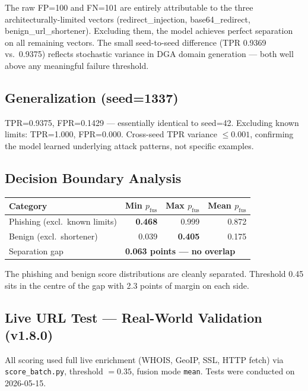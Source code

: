 \documentclass[11pt,a4paper]{article}
\newcommand{\code}[1]{\texttt{#1}}
\begin{document}
The raw FP=100 and FN=101 are entirely attributable to the three
architecturally-limited vectors (redirect\_injection, base64\_redirect,
benign\_url\_shortener). Excluding them, the model achieves perfect
separation on all remaining vectors. The small seed-to-seed difference
(TPR 0.9369 vs.\ 0.9375) reflects stochastic variance in DGA domain
generation --- both well above any meaningful failure threshold.

\subsection{Generalization (seed=1337)}

TPR=0.9375, FPR=0.1429 --- essentially identical to seed=42.
Excluding known limits: TPR=1.000, FPR=0.000. Cross-seed TPR
variance $\leq 0.001$, confirming the model learned underlying attack
patterns, not specific examples.

\subsection{Decision Boundary Analysis}

\begin{table}[h]
\centering
\begin{tabular}{lrrr}
\toprule
Category & Min $p_{\text{fus}}$ & Max $p_{\text{fus}}$ &
  Mean $p_{\text{fus}}$ \\
\midrule
Phishing (excl.\ known limits) & \textbf{0.468} & 0.999 & 0.872 \\
Benign (excl.\ shortener)      & 0.039 & \textbf{0.405} & 0.175 \\
\midrule
Separation gap & \multicolumn{3}{l}{\textbf{0.063 points --- no
overlap}} \\
\bottomrule
\end{tabular}
\end{table}

The phishing and benign score distributions are cleanly separated.
Threshold 0.45 sits in the centre of the gap with 2.3 points of
margin on each side.

\subsection{Live URL Test --- Real-World Validation (v1.8.0)}

All scoring used full live enrichment (WHOIS, GeoIP, SSL, HTTP fetch)
via \code{score\_batch.py}, threshold $= 0.35$, fusion mode
\code{mean}. Tests were conducted on 2026-05-15.
\end{document}
